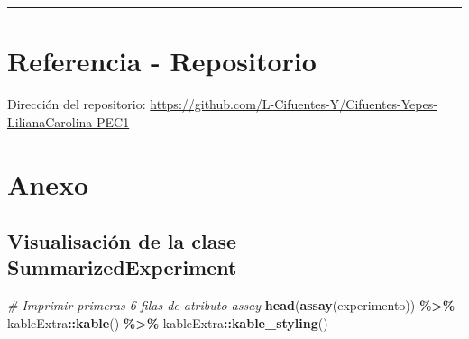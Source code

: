 \documentclass[
]{article}
\newenvironment{Shaded}{\begin{snugshade}}{\end{snugshade}}
\newcommand{\CommentTok}[1]{\textcolor[rgb]{0.56,0.35,0.01}{\textit{#1}}}
\newcommand{\FunctionTok}[1]{\textcolor[rgb]{0.13,0.29,0.53}{\textbf{#1}}}
\newcommand{\NormalTok}[1]{#1}
\newcommand{\SpecialCharTok}[1]{\textcolor[rgb]{0.81,0.36,0.00}{\textbf{#1}}}
\begin{document}
\begin{center}\rule{0.5\linewidth}{0.5pt}\end{center}

\section{Referencia - Repositorio}\label{referencia---repositorio}

Dirección del repositorio:
\url{https://github.com/L-Cifuentes-Y/Cifuentes-Yepes-LilianaCarolina-PEC1}

\section{Anexo}\label{anexo}

\subsection{Visualisación de la clase
SummarizedExperiment}\label{visualisaciuxf3n-de-la-clase-summarizedexperiment}

\begin{Shaded}
\begin{Highlighting}[]
\CommentTok{\# Imprimir primeras 6 filas de atributo assay}
\FunctionTok{head}\NormalTok{(}\FunctionTok{assay}\NormalTok{(experimento)) }\SpecialCharTok{\%\textgreater{}\%}
\NormalTok{  kableExtra}\SpecialCharTok{::}\FunctionTok{kable}\NormalTok{() }\SpecialCharTok{\%\textgreater{}\%}
\NormalTok{  kableExtra}\SpecialCharTok{::}\FunctionTok{kable\_styling}\NormalTok{()}
\end{Highlighting}
\end{Shaded}
\end{document}
